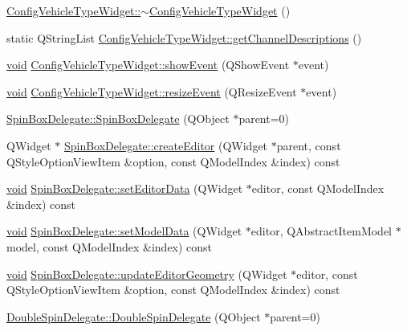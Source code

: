 \begin{DoxyCompactItemize}
\item 
\hyperlink{group___config_plugin_ga7edb0b23fc32af7728baa08038a79202}{\-Config\-Vehicle\-Type\-Widget\-::$\sim$\-Config\-Vehicle\-Type\-Widget} ()
\item 
static \-Q\-String\-List \hyperlink{group___config_plugin_ga65301666bc0f14e94e8f718af4e6cc08}{\-Config\-Vehicle\-Type\-Widget\-::get\-Channel\-Descriptions} ()
\item 
\hyperlink{group___u_a_v_objects_plugin_ga444cf2ff3f0ecbe028adce838d373f5c}{void} \hyperlink{group___config_plugin_gab830a9c8fbb8c286953a005382701f94}{\-Config\-Vehicle\-Type\-Widget\-::show\-Event} (\-Q\-Show\-Event $\ast$event)
\item 
\hyperlink{group___u_a_v_objects_plugin_ga444cf2ff3f0ecbe028adce838d373f5c}{void} \hyperlink{group___config_plugin_gaa35315a56ddec502ecc1c683b51364d8}{\-Config\-Vehicle\-Type\-Widget\-::resize\-Event} (\-Q\-Resize\-Event $\ast$event)
\item 
\hyperlink{group___config_plugin_gabf1b830266511d0237c97b46f49e01f9}{\-Spin\-Box\-Delegate\-::\-Spin\-Box\-Delegate} (\-Q\-Object $\ast$parent=0)
\item 
\-Q\-Widget $\ast$ \hyperlink{group___config_plugin_ga4fc1b4a209668b60b0834bdb1d36e1c0}{\-Spin\-Box\-Delegate\-::create\-Editor} (\-Q\-Widget $\ast$parent, const \-Q\-Style\-Option\-View\-Item \&option, const \-Q\-Model\-Index \&index) const 
\item 
\hyperlink{group___u_a_v_objects_plugin_ga444cf2ff3f0ecbe028adce838d373f5c}{void} \hyperlink{group___config_plugin_gacbac1fc1091ef04b08ca9683a1d6f0ee}{\-Spin\-Box\-Delegate\-::set\-Editor\-Data} (\-Q\-Widget $\ast$editor, const \-Q\-Model\-Index \&index) const 
\item 
\hyperlink{group___u_a_v_objects_plugin_ga444cf2ff3f0ecbe028adce838d373f5c}{void} \hyperlink{group___config_plugin_ga3698304b3741f548b0b4755c1782d291}{\-Spin\-Box\-Delegate\-::set\-Model\-Data} (\-Q\-Widget $\ast$editor, \-Q\-Abstract\-Item\-Model $\ast$model, const \-Q\-Model\-Index \&index) const 
\item 
\hyperlink{group___u_a_v_objects_plugin_ga444cf2ff3f0ecbe028adce838d373f5c}{void} \hyperlink{group___config_plugin_ga3a90cff710ddd79a11b31054f9c963fb}{\-Spin\-Box\-Delegate\-::update\-Editor\-Geometry} (\-Q\-Widget $\ast$editor, const \-Q\-Style\-Option\-View\-Item \&option, const \-Q\-Model\-Index \&index) const 
\item 
\hyperlink{group___config_plugin_ga53d62f046bdee3e5b67f2b82aaa08a8a}{\-Double\-Spin\-Delegate\-::\-Double\-Spin\-Delegate} (\-Q\-Object $\ast$parent=0)

\end{DoxyCompactItemize}

